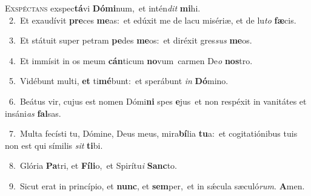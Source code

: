 \lettrine{\initial\textcolor{\initialcolor}{E}}{xspéctans} exspec\-\textbf{tá}\-vi \textbf{Dó}\-\textbf{mi}num,~\star et intén\textit{dit} \textbf{mi}\-hi.\\
{\numbfont\textcolor{\numbcolor}{~2.}}~Et exaudívit \textbf{pre}\-ces \textbf{me}\-as:~\star et edúxit me de lacu misériæ, et de lu\textit{to} \textbf{fæ}\-cis.\par
{\numbfont\textcolor{\numbcolor}{~3.}}~Et státuit super petram \textbf{pe}\-des \textbf{me}\-os:~\star et diréxit gres\textit{sus} \textbf{me}\-os.\par
{\numbfont\textcolor{\numbcolor}{~4.}}~Et immísit in os meum \textbf{cán}\-ticum \textbf{no}\-vum~\star carmen De\textit{o} \textbf{nos}\-tro.\par
{\numbfont\textcolor{\numbcolor}{~5.}}~Vidébunt multi, \textbf{et} ti\-\textbf{mé}\-bunt:~\star et sperábunt \textit{in} \textbf{Dó}\-mino.\par
{\numbfont\textcolor{\numbcolor}{~6.}}~Beátus vir, cujus est nomen Dómi\textbf{ni} spes \textbf{e}\-jus~\star et non respéxit in vanitátes et insáni\textit{as} \textbf{fal}\-sas.\par
{\numbfont\textcolor{\numbcolor}{~7.}}~Multa fecísti tu, Dómine, Deus meus, mira\-\textbf{bí}\-lia \textbf{tu}\-a:~\star et cogitatiónibus tuis non est qui símilis \textit{sit} \textbf{ti}\-bi.\par
{\numbfont\textcolor{\numbcolor}{~8.}}~Glória \textbf{Pa}\-tri, et \textbf{Fí}\-\textbf{li}o,~\star et Spirítu\textit{i} \textbf{Sanc}\-to.\par
{\numbfont\textcolor{\numbcolor}{~9.}}~Sicut erat in princípio, et \textbf{nunc}\-, et \textbf{sem}\-per,~\star et in sǽcula sæculó\-\textit{rum}\-. \textbf{A}\-men.\par
